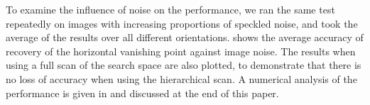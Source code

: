 To examine the influence of noise on the performance, we ran the same test
repeatedly on images with increasing proportions of speckled noise, and took
the average of the results over all different orientations.
 shows the average accuracy of recovery of the
horizontal vanishing point against image noise.  The results when using a full
scan of the search space are also plotted, to demonstrate that there is no loss
of accuracy when using the hierarchical scan.  A numerical analysis of the
performance is given in  and discussed at the end of this
paper.



